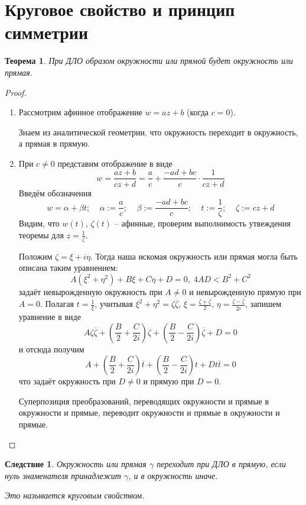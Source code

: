 \documentclass[a4paper,12pt]{article}
\theoremstyle{plain}
\newtheorem{theorem}{Теорема}[section]
\newtheorem*{corollary}{Следствие}
\theoremstyle{definition}
\theoremstyle{remark}
\begin{document}
\section{Круговое свойство и принцип симметрии}
\begin{theorem}
	При ДЛО образом окружности или прямой будет окружность или прямая.
\end{theorem}

\begin{proof}
	\begin{enumerate}
		\item Рассмотрим афинное отображение $w = az + b$ (когда $c = 0$).

		      Знаем из аналитической геометрии, что окружность переходит в окружность, а прямая в прямую.
		\item При $c \neq 0$ представим отображение в виде
		      \[
			      w = \frac{az + b}{cz + d} = \frac{a}{c} + \frac{-ad + bc}{c}\cdot\frac{1}{cz + d}
		      \]
		      Введём обозначения
		      \[
			      w = \alpha + \beta t;\;\;\;\; \alpha := \frac{a}{c};\;\;\;\; \beta := \frac{-ad + bc}{c};\;\;\;\; t := \frac{1}{\zeta} ;\;\;\;\; \zeta := cz + d
		      \]
		      Видим, что $w(t),\, \zeta(t)$ -- афинные, проверим выполнимость утвеждения теоремы для $z = \frac{1}{\zeta}$.

		      Положим $\zeta = \xi + i\eta$. Тогда наша искомая окружность или прямая могла быть описана таким уравнением:
		      \[
			      A(\xi^2 + \eta^2) + B\xi + C\eta + D = 0,\; 4AD < B^2 + C^2
		      \]
		      задаёт невырожденную окружность при $A \neq 0$ и невырожденную прямую при $A = 0$. Полагая $t = \frac{1}{\xi}$, учитывая $\xi^2 + \eta^2 = \zeta\overline{\zeta},\, \xi = \frac{\zeta + \overline{\zeta}}{2},\, \eta = \frac{\zeta - \overline{\zeta}}{2i}$, запишем уравнение в виде
		      \[
			      A\zeta\overline{\zeta} + \left(\frac{B}{2} + \frac{C}{2i}\right)\zeta + \left(\frac{B}{2} - \frac{C}{2i}\right)\overline{\zeta} + D = 0
		      \]
		      и отсюда получим
		      \[
			      A + \left(\frac{B}{2} + \frac{C}{2i}\right)\overline{t} + \left(\frac{B}{2} - \frac{C}{2i}\right)t + Dt\overline{t} = 0
		      \]
		      что задаёт окружность при $D \neq 0$ и прямую при $D = 0$.

		      Суперпозиция преобразований, переводящих окружности и прямые в окружности и прямые, переводит окружности и прямые в окружности и прямые.
	\end{enumerate}
\end{proof}

\begin{corollary}
	Окружность или прямая $\gamma$ переходит при ДЛО в прямую, если нуль знаменателя принадлежит $\gamma$, и в окружность иначе.

	Это называется круговым свойством.
\end{corollary}
\end{document}
